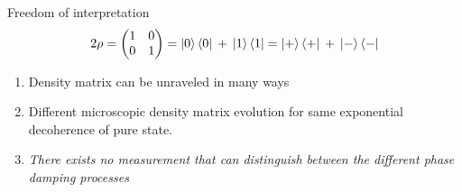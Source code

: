 \documentclass{beamer}
\begin{document}
\begin{frame}{Freedom of interpretation}
	\begin{equation*}
	2\rho = 
	\begin{pmatrix}
	1 & 0 \\
	0 & 1
	\end{pmatrix}=
	\ket{0}\bra{0} \hspace{2pt} + \hspace{2pt}\ket{1}\bra{1}=\ket{+}\bra{+} \hspace{2pt}+ \hspace{2pt}\ket{-}\bra{-}
	\end{equation*}
	\begin{enumerate}
		\item Density matrix can be unraveled in many ways
		\item Different microscopic density matrix evolution for same exponential decoherence of pure state.
		\item \emph{There exists no measurement that can distinguish between the different phase damping processes}
	\end{enumerate}
\end{frame}
\end{document}
